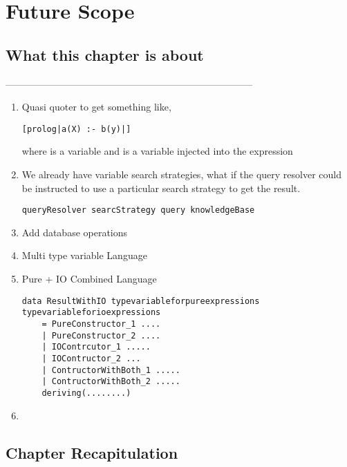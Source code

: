 \documentclass[thesis-solanki.tex]{subfiles}
\begin{document}
\chapter{Future Scope}\label{chap:futureScope}


\section{What this chapter is about}

-----------------------------------------------------------------------------


\begin{enumerate}

\item Quasi quoter to get something like,
\begin{verbatim}
[prolog|a(X) :- b(y)|]
\end{verbatim}
where  is a   variable and  is a  variable injected into
the expression 


\item
  We already have variable search strategies, what if the query resolver could be instructed to use a particular
  search strategy to get the result.
\begin{verbatim}
queryResolver searcStrategy query knowledgeBase
\end{verbatim}


\item Add database operations

\item Multi type variable Language

\item Pure + IO Combined Language

\begin{verbatim}
data ResultWithIO typevariableforpureexpressions typevariableforioexpressions
	= PureConstructor_1 ....
	| PureConstructor_2 ....
	| IOContrcutor_1 .....
	| IOContructor_2 ...
	| ContructorWithBoth_1 .....
	| ContructorWithBoth_2 .....
	deriving(........)
\end{verbatim}

\item 

\end{enumerate}


\section{Chapter Recapitulation}

\ifMain
\begin{scope}
  \nolinenumbers
  \enotesize
  \par
  \begin{singlespace}
  \setlength{\parskip}{12pt plus 2pt minus 1pt}
  \theendnotes
  \par
  \end{singlespace}
\end{scope}
\fi
\end{document}
